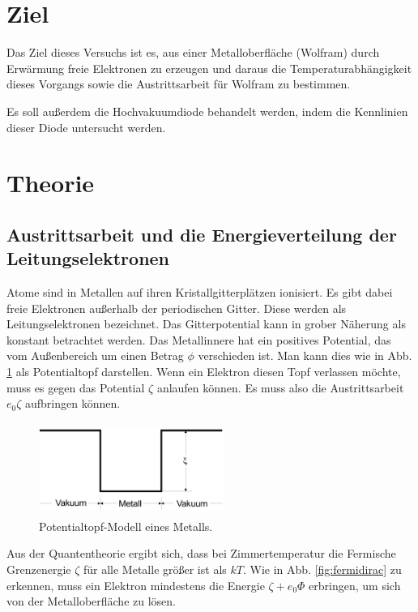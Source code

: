 \section{Ziel}
Das Ziel dieses Versuchs ist es, aus einer Metalloberfläche
(Wolfram) durch Erwärmung freie Elektronen zu erzeugen und
daraus die Temperaturabhängigkeit dieses Vorgangs sowie die
Austrittsarbeit für Wolfram zu bestimmen.

\noindent Es soll außerdem die Hochvakuumdiode behandelt werden,
indem die Kennlinien dieser Diode untersucht werden.

\section{Theorie}
\label{sec:Theorie}

\subsection{Austrittsarbeit und die Energieverteilung der Leitungselektronen}

Atome sind in Metallen auf ihren Kristallgitterplätzen 
ionisiert. Es gibt dabei freie Elektronen außerhalb 
der periodischen Gitter. Diese werden als Leitungselektronen 
bezeichnet. Das Gitterpotential kann in grober Näherung als 
konstant betrachtet werden. Das Metallinnere hat ein positives 
Potential, das vom Außenbereich um einen Betrag $\phi$ 
verschieden ist. Man kann dies wie in Abb. \ref{fig:topf}
als Potentialtopf darstellen. Wenn ein Elektron diesen Topf 
verlassen möchte, muss es gegen das Potential $\zeta$ 
anlaufen können. Es muss also die Austrittsarbeit $e_0 \zeta$ %
aufbringen können. 

\begin{figure}
    \centering
    \includegraphics[width=6cm, height=3cm]{build/potentialtopf.png}
    \caption{Potentialtopf-Modell eines Metalls. \cite{V504}}
    \label{fig:topf}
\end{figure}

\noindent Aus der Quantentheorie ergibt sich, dass bei Zimmertemperatur 
die Fermische Grenzenergie $\zeta$ für alle Metalle größer ist 
als $k T$. Wie in Abb. \ref{fig:fermidirac} zu erkennen, muss
ein Elektron mindestens die Energie $\zeta + e_0 \Phi$ 
erbringen, um sich von der Metalloberfläche zu lösen. 

